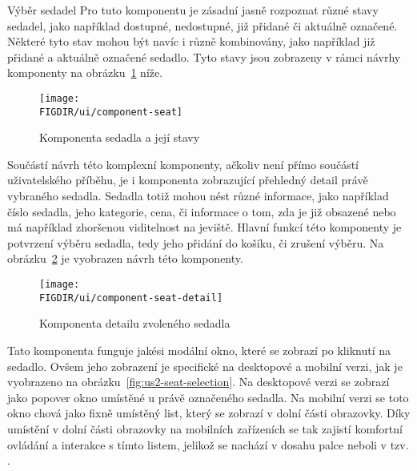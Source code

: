 \begin{subsection}{Výběr sedadel}
    Pro tuto komponentu je zásadní jasně rozpoznat různé stavy sedadel, jako například dostupné, nedostupné, již přidané či aktuálně označené.
    Některé tyto stav mohou být navíc i různě kombinovány, jako například již přidané a aktuálně označené sedadlo.
    Tyto stavy jsou zobrazeny v rámci návrhy komponenty  na obrázku~\ref{fig:component-seat} níže.

    \begin{figure}[H]
        \centering
        \texttt{[image: \\FIGDIR/ui/component-seat]}
        \caption{Komponenta sedadla a její stavy}
        \label{fig:component-seat}
    \end{figure}

    Součástí návrh této komplexní komponenty, ačkoliv není přímo součástí uživatelského příběhu, je i komponenta zobrazující přehledný detail právě vybraného sedadla.
    Sedadla totiž mohou nést různé informace, jako například číslo sedadla, jeho kategorie, cena, či informace o tom, zda je již obsazené nebo má například zhoršenou viditelnost na jeviště.
    Hlavní funkcí této komponenty je potvrzení výběru sedadla, tedy jeho přidání do košíku, či zrušení výběru.
    Na obrázku~\ref{fig:component-seat-} je vyobrazen návrh této komponenty.

    \begin{figure}[H]
        \centering
        \texttt{[image: \\FIGDIR/ui/component-seat-detail]}
        \caption{Komponenta detailu zvoleného sedadla}
        \label{fig:component-seat-}
    \end{figure}

    Tato komponenta funguje jakési modální okno, které se zobrazí po kliknutí na sedadlo.
    Ovšem jeho zobrazení je specifické na desktopové a mobilní verzi, jak je vyobrazeno na obrázku~\ref{fig:us2-seat-selection}.
    Na desktopové verzi se zobrazí jako popover okno umístěné u právě označeného sedadla.
    Na mobilní verzi se toto okno chová jako fixně umístěný list, který se zobrazí v dolní části obrazovky.
    Díky umístění v dolní části obrazovky na mobilních zařízeních se tak zajistí komfortní ovládání a interakce s tímto listem, jelikož se nachází v dosahu palce neboli v tzv. .
\end{subsection}

